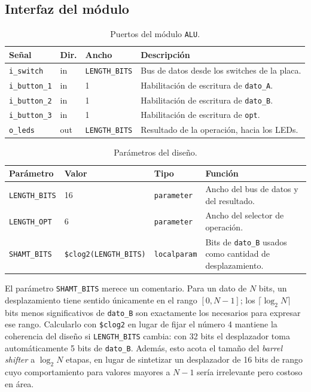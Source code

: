 \documentclass[12pt,a4paper]{article}
\begin{document}
\subsection{Interfaz del módulo}

\begin{table}[H]
  \centering
  \begin{tabular}{lllp{6.2cm}}
    \toprule
    \textbf{Señal} & \textbf{Dir.} & \textbf{Ancho} & \textbf{Descripción} \\
    \midrule
    \texttt{i\_switch}   & in  & \texttt{LENGTH\_BITS} & Bus de datos desde los switches de la placa. \\
    \texttt{i\_button\_1} & in  & 1 & Habilitación de escritura de \texttt{dato\_A}. \\
    \texttt{i\_button\_2} & in  & 1 & Habilitación de escritura de \texttt{dato\_B}. \\
    \texttt{i\_button\_3} & in  & 1 & Habilitación de escritura de \texttt{opt}. \\
    \texttt{o\_leds}     & out & \texttt{LENGTH\_BITS} & Resultado de la operación, hacia los LEDs. \\
    \bottomrule
  \end{tabular}
  \caption{Puertos del módulo \texttt{ALU}.}
  \label{tab:puertos}
\end{table}

\begin{table}[H]
  \centering
  \small
  \begin{tabular}{lll p{5.2cm}}
    \toprule
    \textbf{Parámetro} & \textbf{Valor} & \textbf{Tipo} & \textbf{Función} \\
    \midrule
    \texttt{LENGTH\_BITS} & 16 & \texttt{parameter} & Ancho del bus de datos y del resultado. \\
    \texttt{LENGTH\_OPT}  & 6  & \texttt{parameter} & Ancho del selector de operación. \\
    \texttt{SHAMT\_BITS}  & \texttt{\$clog2(LENGTH\_BITS)} & \texttt{localparam} & Bits de \texttt{dato\_B} usados como cantidad de desplazamiento. \\
    \bottomrule
  \end{tabular}
  \caption{Parámetros del diseño.}
  \label{tab:params}
\end{table}

El parámetro \texttt{SHAMT\_BITS} merece un comentario. Para un dato de $N$
bits, un desplazamiento tiene sentido únicamente en el rango $[0, N-1]$; los
$\lceil \log_2 N \rceil$ bits menos significativos de \texttt{dato\_B} son
exactamente los necesarios para expresar ese rango. Calcularlo con
\texttt{\$clog2} en lugar de fijar el número 4 mantiene la coherencia del
diseño si \texttt{LENGTH\_BITS} cambia: con 32 bits el desplazador toma
automáticamente 5 bits de \texttt{dato\_B}. Además, esto acota el tamaño del
\emph{barrel shifter} a $\log_2 N$ etapas, en lugar de sintetizar un
desplazador de 16 bits de rango cuyo comportamiento para valores mayores a
$N-1$ sería irrelevante pero costoso en área.
\end{document}
